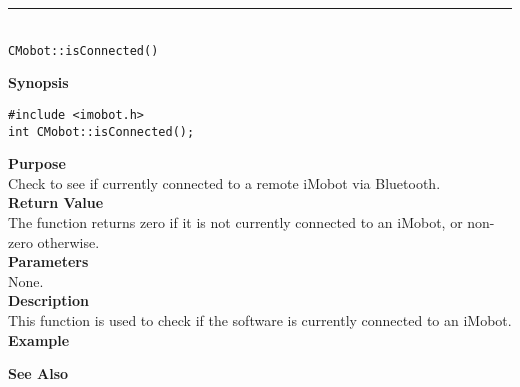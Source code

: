 \noindent
\vspace{5pt}
\rule{4.5in}{0.015in}\\
\noindent
{\LARGE \texttt{CMobot::isConnected()}}\\
{}

\noindent
{\bf Synopsis}\\
\begin{verbatim}
#include <imobot.h>
int CMobot::isConnected();
\end{verbatim}

\noindent
{\bf Purpose}\\
Check to see if currently connected to a remote iMobot via Bluetooth.\\

\noindent
{\bf Return Value}\\
The function returns zero if it is not currently connected to an iMobot, or non-zero otherwise.\\

\noindent
{\bf Parameters}\\
None.\\

\noindent
{\bf Description}\\
This function is used to check if the software is currently connected to
an iMobot.\\

\noindent
{\bf Example}\\
\noindent

\noindent
{\bf See Also}\\

